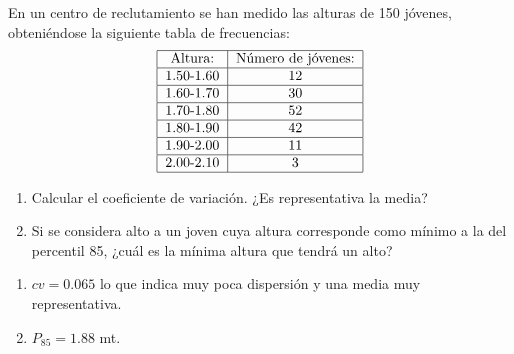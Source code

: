 {En un centro de reclutamiento se han medido las alturas de 150 jóvenes, obteniéndose la siguiente tabla de frecuencias:
\[
\begin{tabular}{|c|c|}
\hline
Altura: & Número de jóvenes: \\ \hline
1.50-1.60 & 12 \\ \hline
1.60-1.70 & 30 \\ \hline
1.70-1.80 & 52 \\ \hline
1.80-1.90 & 42 \\ \hline
1.90-2.00 & 11 \\ \hline
2.00-2.10 & 3 \\ \hline
\end{tabular}
\]

\begin{enumerate}
\item Calcular el coeficiente de variación. ¿Es representativa la media?
\item  Si se considera alto a un joven cuya altura corresponde como mínimo a la del percentil 85, ¿cuál es la
mínima altura que tendrá un alto?
\end{enumerate}
}
{\begin{enumerate}
\item $cv=0.065$ lo que indica muy poca dispersión y una media muy representativa.
\item $ P_{85}=1.88$ mt.
\end{enumerate}
}
